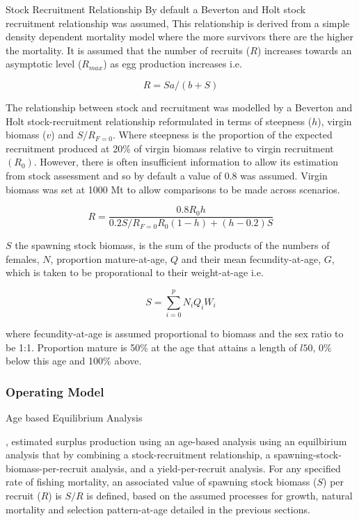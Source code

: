 \documentclass[preprint,review,12pt]{elsarticle}
\begin{document}
Stock Recruitment Relationship
By default a Beverton and Holt stock recruitment relationship \cite{beverton1993dynamics} was assumed, This relationship is derived from a simple density dependent mortality model where the more survivors there are the higher the mortality. It is assumed that the number of recruits ($R$) increases towards an asymptotic level ($R_{max}$) as egg production increases i.e.  
 
 \begin{equation} R=Sa/(b+S) \end{equation} 


The relationship between stock and recruitment was modelled by a Beverton and Holt stock-recruitment relationship \cite{beverton1993dynamics} reformulated in terms of steepness ($h$), virgin biomass ($v$) and $S/R_{F=0}$. Where steepness is the proportion of the expected recruitment produced at 20\% of virgin biomass relative to virgin recruitment  $(R_0)$. However, there is often insufficient information to allow its estimation from stock assessment \cite{pepin2015reconsidering} and so by default a value of 0.8 was assumed. Virgin biomass was set at 1000 Mt to allow comparisons to be made across scenarios.

\begin{equation}
R=\frac{0.8R_0h}{0.2S/R_{F=0}R_0(1-h)+(h-0.2)S}
\end{equation} 

$S$ the spawning stock biomass, is the sum of the products of the numbers of females, $N$, proportion mature-at-age, $Q$ and their mean fecundity-at-age, $G$, which is taken to be proporational to their weight-at-age i.e. 

\begin{equation} S = \sum\limits_{i=0}^{p} {N_iQ_iW_i} \end{equation}

where fecundity-at-age is assumed proportional to biomass and the sex ratio to be 1:1. Proportion mature is 50\% at the age that attains a length of $l50$, 0\% below this age and 100\% above. 


\subsubsection{Operating Model}

Age based Equilibrium Analysis 

\cite{sissenwine1987alternative}, estimated surplus production using an age-based analysis using an equilbirium analysis that by combining a stock-recruitment relationship, a spawning-stock-biomass-per-recruit analysis, and a yield-per-recruit analysis. For any specified rate of fishing mortality, an associated value of spawning stock biomass ($S$) per recruit ($R$) is $S/R$ is defined, based on the assumed processes for growth, natural mortality and selection pattern-at-age detailed in the previous sections.
\end{document}
